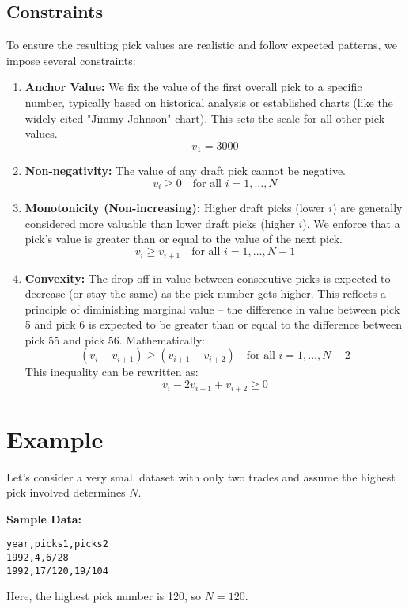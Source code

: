 \documentclass{article}
\begin{document}
\subsection{Constraints}
To ensure the resulting pick values are realistic and follow expected patterns, we impose several constraints:

\begin{enumerate}
    \item \textbf{Anchor Value:} We fix the value of the first overall pick to a specific number, typically based on historical analysis or established charts (like the widely cited "Jimmy Johnson" chart). This sets the scale for all other pick values.
    \[
    v_1 = 3000
    \]

    \item \textbf{Non-negativity:} The value of any draft pick cannot be negative.
    \[
    v_i \ge 0 \quad \text{for all } i = 1, \dots, N
    \]

    \item \textbf{Monotonicity (Non-increasing):} Higher draft picks (lower $i$) are generally considered more valuable than lower draft picks (higher $i$). We enforce that a pick's value is greater than or equal to the value of the next pick.
    \[
    v_i \ge v_{i+1} \quad \text{for all } i = 1, \dots, N-1
    \]

    \item \textbf{Convexity:} The drop-off in value between consecutive picks is expected to decrease (or stay the same) as the pick number gets higher. This reflects a principle of diminishing marginal value – the difference in value between pick 5 and pick 6 is expected to be greater than or equal to the difference between pick 55 and pick 56. Mathematically:
    \[
    (v_i - v_{i+1}) \ge (v_{i+1} - v_{i+2}) \quad \text{for all } i = 1, \dots, N-2
    \]
    This inequality can be rewritten as:
    \[
    v_i - 2v_{i+1} + v_{i+2} \ge 0
    \]
\end{enumerate}

\section{Example}

Let's consider a very small dataset with only two trades and assume the highest pick involved determines $N$.

\textbf{Sample Data:}
\begin{verbatim}
year,picks1,picks2
1992,4,6/28
1992,17/120,19/104
\end{verbatim}
Here, the highest pick number is 120, so $N=120$.
\end{document}
